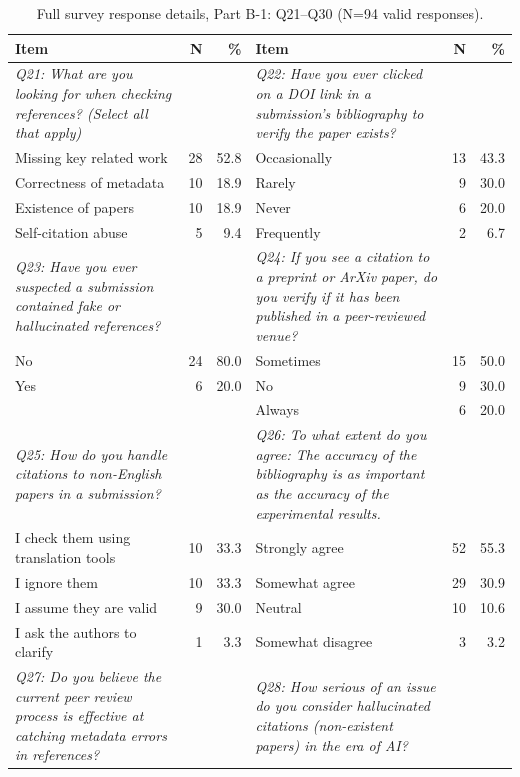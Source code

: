 \begin{table}[htbp]
\centering
\caption{Full survey response details, Part B-1: Q21--Q30 (N=94 valid responses).}
\label{tab:survey_details_full_b1}
\small
\begin{tabular}{p{6cm}rr|p{6cm}rr}
\toprule
\textbf{Item} & \textbf{N} & \textbf{\%} & \textbf{Item} & \textbf{N} & \textbf{\%} \\
\midrule
\textit{Q21: What are you looking for when checking references? (Select all that apply)} & & & \textit{Q22: Have you ever clicked on a DOI link in a submission's bibliography to verify the paper exists?} & & \\
\rowcolor{tableRowLight}
Missing key related work & 28 & 52.8 & Occasionally & 13 & 43.3 \\
Correctness of metadata & 10 & 18.9 & Rarely & 9 & 30.0 \\
\rowcolor{tableRowLight}
Existence of papers & 10 & 18.9 & Never & 6 & 20.0 \\
Self-citation abuse & 5 & 9.4 & Frequently & 2 & 6.7 \\
\midrule
\textit{Q23: Have you ever suspected a submission contained fake or hallucinated references?} & & & \textit{Q24: If you see a citation to a preprint or ArXiv paper, do you verify if it has been published in a peer-reviewed venue?} & & \\
\rowcolor{tableRowLight}
No & 24 & 80.0 & Sometimes & 15 & 50.0 \\
Yes & 6 & 20.0 & No & 9 & 30.0 \\
\rowcolor{tableRowLight}
 &  &  & Always & 6 & 20.0 \\
\midrule
\textit{Q25: How do you handle citations to non-English papers in a submission?} & & & \textit{Q26: To what extent do you agree: The accuracy of the bibliography is as important as the accuracy of the experimental results.} & & \\
\rowcolor{tableRowLight}
I check them using translation tools & 10 & 33.3 & Strongly agree & 52 & 55.3 \\
I ignore them & 10 & 33.3 & Somewhat agree & 29 & 30.9 \\
\rowcolor{tableRowLight}
I assume they are valid & 9 & 30.0 & Neutral & 10 & 10.6 \\
I ask the authors to clarify & 1 & 3.3 & Somewhat disagree & 3 & 3.2 \\
\rowcolor{tableRowLight}
\midrule
\textit{Q27: Do you believe the current peer review process is effective at catching metadata errors in references?} & & & \textit{Q28: How serious of an issue do you consider hallucinated citations (non-existent papers) in the era of AI?} & & \\

\end{tabular}
\end{table}

